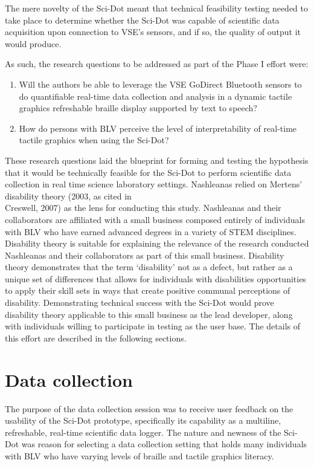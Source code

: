 \documentclass[11.5pt]{sig-alternate}
\begin{document}
\begin{large}
The mere novelty of the Sci-Dot meant that technical feasibility testing needed to take place to determine whether the Sci-Dot was capable of scientific data acquisition upon connection to VSE’s sensors, and if so, the quality of output it would produce. 

As such, the research questions to be addressed as part of the Phase I effort were: 
\begin{enumerate}
    \item Will the authors be able to leverage the VSE GoDirect Bluetooth sensors to do quantifiable real-time data collection and analysis in a dynamic tactile graphics refreshable braille display supported by text to speech?
    \item How do persons with BLV perceive the level of interpretability of real-time tactile graphics when using the Sci-Dot? 
\end{enumerate}
These research questions laid the blueprint for forming and testing the hypothesis that it would be technically feasible for the Sci-Dot to perform scientific data collection in real time science laboratory settings. Nashleanas relied on Mertens’ disability theory (2003, as cited in \\Creswell, 2007) as the lens for conducting this study. Nashleanas and their collaborators are affiliated with a small business composed entirely of individuals with BLV who have earned advanced degrees in a variety of STEM disciplines. Disability theory is suitable for explaining the relevance of the research conducted Nashleanas and their collaborators as part of this small business. Disability theory demonstrates that the term ‘disability’ not as a defect, but rather as a unique set of differences that allows for individuals with disabilities opportunities to apply their skill sets in ways that create positive communal perceptions of disability. Demonstrating technical success with the Sci-Dot would prove disability theory applicable to this small business as the lead developer, along with individuals willing to participate in testing as the user base. The details of this effort are described in the following sections.
\section*{Data collection}
The purpose of the data collection session was to receive user feedback on the usability of the Sci-Dot prototype, specifically its capability as a multiline, refreshable, real-time scientific data logger. The nature and newness of the Sci-Dot was reason for selecting a data collection setting that holds many individuals with BLV who have varying levels of braille and tactile graphics literacy. 


\end{large}
\end{document}
